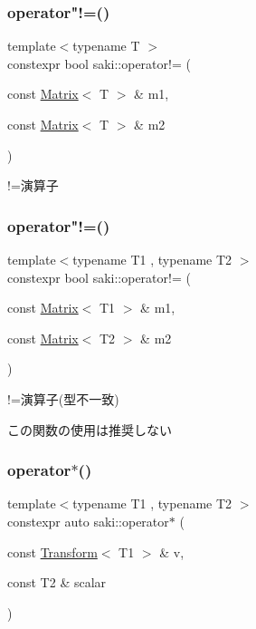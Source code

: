 \subsubsection{\texorpdfstring{operator"!=()}{operator!=()}\hspace{0.1cm}{\footnotesize\ttfamily [9/10]}}
{\footnotesize\ttfamily template$<$typename T $>$ \\
constexpr bool saki\+::operator!= (\begin{DoxyParamCaption}\item[{const \mbox{\hyperlink{classsaki_1_1_matrix}{Matrix}}$<$ T $>$ \&}]{m1,  }\item[{const \mbox{\hyperlink{classsaki_1_1_matrix}{Matrix}}$<$ T $>$ \&}]{m2 }\end{DoxyParamCaption})}



!=演算子 

\mbox{\label{namespacesaki_afce7efc7fea0dc8cd8bc6a10d231261e}} 
\subsubsection{\texorpdfstring{operator"!=()}{operator!=()}\hspace{0.1cm}{\footnotesize\ttfamily [10/10]}}
{\footnotesize\ttfamily template$<$typename T1 , typename T2 $>$ \\
constexpr bool saki\+::operator!= (\begin{DoxyParamCaption}\item[{const \mbox{\hyperlink{classsaki_1_1_matrix}{Matrix}}$<$ T1 $>$ \&}]{m1,  }\item[{const \mbox{\hyperlink{classsaki_1_1_matrix}{Matrix}}$<$ T2 $>$ \&}]{m2 }\end{DoxyParamCaption})}



!=演算子(型不一致) 

この関数の使用は推奨しない \mbox{\label{namespacesaki_a34247f1a3390c2425f56909e10cc11f7}} 
\subsubsection{\texorpdfstring{operator$\ast$()}{operator*()}\hspace{0.1cm}{\footnotesize\ttfamily [1/14]}}
{\footnotesize\ttfamily template$<$typename T1 , typename T2 $>$ \\
constexpr auto saki\+::operator$\ast$ (\begin{DoxyParamCaption}\item[{const \mbox{\hyperlink{classsaki_1_1_transform}{Transform}}$<$ T1 $>$ \&}]{v,  }\item[{const T2 \&}]{scalar }\end{DoxyParamCaption})}



